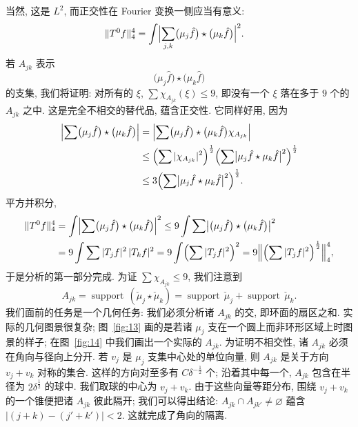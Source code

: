 当然, 这是 $L^{2}$, 而正交性在 Fourier 变换一侧应当有意义:
\begin{align*}
\|T^{0}f\|_{4}^{4}
&=\int\Bigl|\sum_{j,k}\bigl(\mu_{j}\hat{f}\bigr)\star\bigl(\mu_{k}\hat{f}\bigr)\Bigr|^{2}.
\end{align*}
若 $A_{jk}$ 表示
\[
\bigl(\mu_{j}\hat{f}\bigr)\star\bigl(\mu_{k}\hat{f}\bigr)
\]
的支集, 我们将证明: 对所有的 $\xi$, $\sum\chi_{A_{jk}}(\xi)\leq 9$, 即没有一个 $\xi$ 落在多于 $9$ 个的 $A_{jk}$ 之中. 这是完全不相交的替代品, 蕴含正交性. 它同样好用, 因为
\begin{align*}
\Bigl|\sum\bigl(\mu_{j}\hat{f}\bigr)\star\bigl(\mu_{k}\hat{f}\bigr)\Bigr|
&=\Bigl|\sum\bigl(\mu_{j}\hat{f}\bigr)\star\bigl(\mu_{k}\hat{f}\bigr)\chi_{A_{jk}}\Bigr| \\
&\leq\Bigl(\sum|\chi_{A_{jk}}|^{2}\Bigr)^{\frac{1}{2}}
\Bigl(\sum\bigl|\mu_{j}\hat{f}\star\mu_{k}\hat{f}\bigr|^{2}\Bigr)^{\frac{1}{2}} \\
&\leq 3\Bigl(\sum\bigl|\mu_{j}\hat{f}\star\mu_{k}\hat{f}\bigr|^{2}\Bigr)^{\frac{1}{2}}.
\end{align*}
平方并积分,
\begin{align*}
\|T^{0}f\|_{4}^{4}
&=\int\Bigl|\sum\bigl(\mu_{j}\hat{f}\bigr)\star\bigl(\mu_{k}\hat{f}\bigr)\Bigr|^{2}
\leq 9\int\sum\bigl|\bigl(\mu_{j}\hat{f}\bigr)\star\bigl(\mu_{k}\hat{f}\bigr)\bigr|^{2} \\
&=9\int\sum|T_{j}f|^{2}\,|T_{k}f|^{2}
=9\int\Bigl(\sum|T_{j}f|^{2}\Bigr)^{2}
=9\Bigl\|\Bigl(\sum|T_{j}f|^{2}\Bigr)^{\frac{1}{2}}\Bigr\|_{4}^{4},
\end{align*}
于是分析的第一部分完成. 为证 $\sum\chi_{A_{jk}}\leq 9$, 我们注意到
\[
A_{jk}=\operatorname{support}\,(\check{\mu}_{j}\star\check{\mu}_{k})
=\operatorname{support}\,\check{\mu}_{j}+\operatorname{support}\,\check{\mu}_{k}.
\]
我们面前的任务是一个几何任务: 我们必须分析诸 $A_{jk}$ 的交, 即环面的扇区之和. 实际的几何图景很复杂; 图~\ref{fig:13} 画的是若诸 $\mu_j$ 支在一个圆上而非环形区域上时图景的样子; 在图~\ref{fig:14} 中我们画出一个实际的 $A_{jk}$. 为证明不相交性, 诸 $A_{jk}$ 必须在角向与径向上分开. 若 $v_j$ 是 $\mu_j$ 支集中心处的单位向量, 则 $A_{jk}$ 是关于方向 $v_j+v_k$ 对称的集合. 这样的方向对至多有 $C\delta^{-\frac{1}{2}}$ 个; 沿着其中每一个, $A_{jk}$ 包含在半径为 $2\delta^{\frac{1}{2}}$ 的球中. 我们取球的中心为 $v_j+v_k$. 由于这些向量等距分布, 围绕 $v_j+v_k$ 的一个锥便把诸 $A_{jk}$ 彼此隔开; 我们可以得出结论: $A_{jk}\cap A_{jk'}\neq\varnothing$ 蕴含 $|(j+k)-(j'+k')|<2$. 这就完成了角向的隔离.

